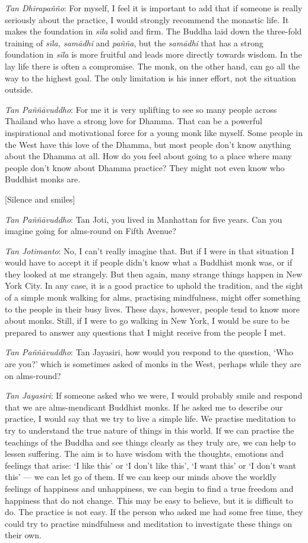 \emph{Tan Dhirapañño}‎: For myself, I feel it is important to add that
if someone is really seriously about the practice, I would strongly
recommend the monastic life. It makes the foundation in \emph{sīla}
solid and firm. The Buddha laid down the three-fold training of
\emph{sīla, samādhi} and \emph{pañña}, but the \emph{samādhi} that has a
strong foundation in \emph{sīla} is more fruitful and leads more
directly towards wisdom. In the lay life there is often a compromise.
The monk, on the other hand, can go all the way to the highest goal. The
only limitation is his inner effort, not the situation outside.

\emph{Tan Paññāvuddho}‎: For me it is very uplifting to see so many
people across Thailand who have a strong love for Dhamma. That can be a
powerful inspirational and motivational force for a young monk like
myself. Some people in the West have this love of the Dhamma, but most
people don't know anything about the Dhamma at all. How do you feel
about going to a place where many people don't know about Dhamma
practice? They might not even know who Buddhist monks are.

{[}Silence and smiles{]}

\emph{Tan Paññāvuddho}‎: Tan Joti, you lived in Manhattan for five
years. Can you imagine going for alms-round on Fifth Avenue?

\emph{Tan Jotimanto}: No, I can't really imagine that. But if I were in
that situation I would have to accept it if people didn't know what a
Buddhist monk was, or if they looked at me strangely. But then again,
many strange things happen in New York City. In any case, it is a good
practice to uphold the tradition, and the sight of a simple monk walking
for alms, practising mindfulness, might offer something to the people in
their busy lives. These days, however, people tend to know more about
monks. Still, if I were to go walking in New York, I would be sure to be
prepared to answer any questions that I might receive from the people I
met.

\emph{Tan Paññāvuddho}‎: Tan Jayasiri, how would you respond to the
question, `Who are you?' which is sometimes asked of monks in the West,
perhaps while they are on alms-round?

\emph{Tan Jayasiri}: If someone asked who we were, I would probably
smile and respond that we are alms-mendicant Buddhist monks. If he asked
me to describe our practice, I would say that we try to live a simple
life. We practise meditation to try to understand the true nature of
things in this world. If we can practise the teachings of the Buddha and
see things clearly as they truly are, we can help to lessen suffering.
The aim is to have wisdom with the thoughts, emotions and feelings that
arise: `I like this' or `I don't like this', `I want this' or `I don't
want this' --- we can let go of them. If we can keep our minds above the
worldly feelings of happiness and unhappiness, we can begin to find a
true freedom and happiness that do not change. This may be easy to
believe, but it is difficult to do. The practice is not easy. If the
person who asked me had some free time, they could try to practise
mindfulness and meditation to investigate these things on their own.

